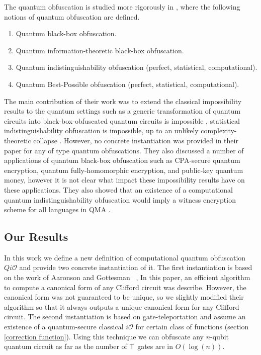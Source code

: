 The quantum obfuscation is studied more rigorously in \cite{AF16arxiv}, where the following notions of quantum obfuscation are defined.
\begin{enumerate}
\item Quantum black-box obfuscation.
\item Quantum information-theoretic black-box obfuscation.
\item Quantum indistinguishability obfuscation (perfect, statistical, computational).
\item Quantum Best-Possible obfuscation (perfect, statistical, computational).
\end{enumerate}

 The main contribution of their work was to extend the classical impossibility results to the quantum settings such as a generic transformation of quantum circuits into black-box-obfuscated quantum circuits is impossible \cite{},  statistical indistinguishability obfuscation is impossible, up to an unlikely complexity-theoretic collapse \cite{}. However, no concrete instantiation was provided in their paper for any of type quantum obfuscations. They also discussed a number of applications of quantum black-box obfuscation such as CPA-secure quantum encryption, quantum fully-homomorphic encryption, and public-key quantum money, however it is not clear what impact these impossibility results have on these applications. They also showed that an existence of a computational quantum indistinguishability obfuscation would imply a witness encryption scheme for all languages in QMA \cite{}.


\subsection{Our Results}

 In this work we define a new definition of computational quantum obfuscation $Qi\mathcal{O}$ and provide two concrete instantiation of it. The first instantiation is based on the work of Aaronson and Gottesman ~\cite{AG04}, In this paper, an efficient algorithm to compute a canonical form of any Clifford circuit was describe. However, the canonical form was not guaranteed to be unique, so we slightly modified their algorithm so that it always outputs a unique canonical form for any Clifford circuit. The second instantiation is based on gate-teleportation \cite{} and assume an existence of a quantum-secure classical $i\mathcal{O}$ for certain class of functions (section \ref{correction function}). Using this technique we can obfuscate any $n$-qubit quantum circuit as far as the number of ${\sf T}$ gates are in $O(\log(n)).$







